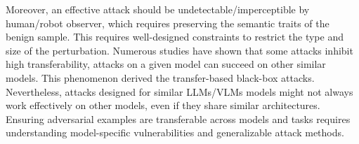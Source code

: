     Moreover, an effective attack should be undetectable/imperceptible by human/robot observer, which requires preserving the semantic traits of the benign sample. 
    This requires well-designed constraints to restrict the type and size of the perturbation. 
    Numerous studies have shown that some attacks inhibit high transferability, \ie attacks on a given model can succeed on other similar models. This phenomenon derived the transfer-based black-box attacks.
    Nevertheless, attacks designed for similar LLMs/VLMs models might not always work effectively on other models, even if they share similar architectures. 
    Ensuring adversarial examples are transferable \cite{liu2016delving} across models and tasks requires understanding model-specific vulnerabilities and generalizable attack methods.





    






